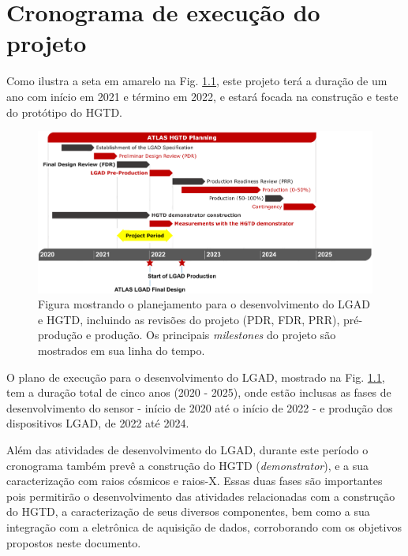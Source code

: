 \chapter{Cronograma de execução do projeto}

Como ilustra a seta em amarelo na Fig. \ref{crono}, este projeto  terá a duração de um ano com início em 2021 e término em 2022, e estará focada na construção e teste do protótipo do HGTD. 

\begin{figure}[H]
    \centering 
    \includegraphics[width=15.0cm]{assets/cronogama.png}
    \caption{Figura mostrando o planejamento para o desenvolvimento do LGAD e HGTD, incluindo as revisões do projeto (PDR, FDR, PRR), pré-produção e produção. Os principais {\it milestones} do projeto são mostrados em sua linha do tempo.}
    \label{crono}
\end{figure}

O plano de execução para o desenvolvimento do LGAD, mostrado na Fig. \ref{crono}, tem a duração total de cinco anos (2020 - 2025), onde estão inclusas as fases de desenvolvimento do sensor - início de 2020 até o início de 2022 - e produção dos dispositivos LGAD, de 2022 até 2024. 
\thispagestyle{plain}

Além das atividades de desenvolvimento do LGAD, durante este período o cronograma também prevê a construção do HGTD (\textit{demonstrator}), e a sua caracterização com raios cósmicos e raios-X. Essas duas fases são importantes pois permitirão o desenvolvimento das atividades relacionadas com a construção do HGTD, a caracterização de seus diversos componentes, bem como a sua integração com a eletrônica de aquisição de dados, corroborando com os objetivos propostos neste documento. 

\renewcommand{\cleardoublepage}{}
\renewcommand{\clearpage}{}